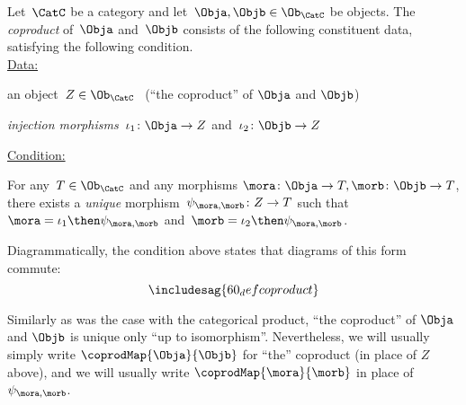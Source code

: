 \begin{ctdefinition}[Coproduct]
\label{def:catcoproduct}
Let~$\CatC$ be a category and let~$\Obja, \Objb \in \Ob_{\CatC}$ be objects. The \emph{coproduct} of~$\Obja$ and~$\Objb$ consists of the following constituent data, satisfying the following condition. \\
\underline{Data:}
\begin{compactenum}
\item an object~$Z \in \Ob_{\CatC}$ \ (``the coproduct'' of $\Obja$ and $\Objb$)
\item \emph{injection morphisms}~$\iota_1 \colon \Obja \to Z $ and~$\iota_2 \colon \Objb \to Z$
\end{compactenum}
\underline{Condition:} 
\begin{compactenum}
\item For any~$T \in \Ob_{\CatC}$ and any morphisms $\mora \colon  \Obja \to T, \morb \colon \Objb \to T$, there exists a \emph{unique} morphism~$\psi_{\mora, \morb} \colon Z \to T$ such that~$\mora = \iota_1\then \psi_{\mora, \morb}$ and~$\morb = \iota_2 \then \psi_{\mora,\morb}$.
\end{compactenum}
\end{ctdefinition} 


\begin{remark}
Diagrammatically, the condition above states that diagrams of this form commute: 
\begin{equation}
\includesag{60_defcoproduct}
\end{equation}
\end{remark}

\begin{remark}
Similarly as was the case with the categorical product, ``the coproduct'' of $\Obja$ and $\Objb$ is unique only ``up to isomorphism''. Nevertheless, we will usually simply write $\coprodMap{\Obja}{\Objb}$ for ``the'' coproduct (in place of $Z$ above), and we will usually write $\coprodMap{\mora}{\morb}$ in place of $\psi_{\mora, \morb}$.
\end{remark}

%
%


%

